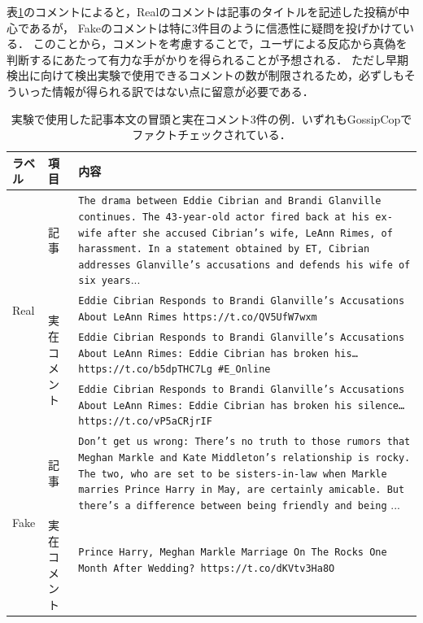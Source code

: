 表\ref{tbl:data_example}のコメントによると，Realのコメントは記事のタイトルを記述した投稿が中心であるが，
Fakeのコメントは特に3件目のように信憑性に疑問を投げかけている．
このことから，コメントを考慮することで，ユーザによる反応から真偽を判断するにあたって有力な手がかりを得られることが予想される．
ただし早期検出に向けて検出実験で使用できるコメントの数が制限されるため，必ずしもそういった情報が得られる訳ではない点に留意が必要である．
\begin{landscape}
\begin{table}[p]
    \centering
    \caption{実験で使用した記事本文の冒頭と実在コメント3件の例．いずれもGossipCopでファクトチェックされている．}
    \label{tbl:data_example}
    \begin{tabularx}{\linewidth}{llX}  \hline
        ラベル & 項目 & 内容 \\ \hline
        \multirow{4}{*}{Real} & 記事                         & \texttt{The drama between Eddie Cibrian and Brandi Glanville continues.  The 43-year-old actor fired back at his ex-wife after she accused Cibrian's wife, LeAnn Rimes, of harassment.  In a statement obtained by ET, Cibrian addresses Glanville's accusations and defends his wife of six years}...\\ \cline{2-3}
                              & \multirow{3}{*}{実在コメント} & \texttt{Eddie Cibrian Responds to Brandi Glanville’s Accusations About LeAnn Rimes https://t.co/QV5UfW7wxm}\\ \cline{3-3}
                              &                             & \texttt{Eddie Cibrian Responds to Brandi Glanville's Accusations About LeAnn Rimes: Eddie Cibrian has broken his… https://t.co/b5dpTHC7Lg \#E\_Online}\\ \cline{3-3}
                              &                             & \texttt{Eddie Cibrian Responds to Brandi Glanville's Accusations About LeAnn Rimes: Eddie Cibrian has broken his silence… https://t.co/vP5aCRjrIF}\\ \hline
        \multirow{4}{*}{Fake} & 記事                         & \texttt{Don’t get us wrong: There’s no truth to those rumors that Meghan Markle and Kate Middleton's relationship is rocky. The two, who are set to be sisters-in-law when Markle marries Prince Harry in May, are certainly amicable. But there’s a difference between being friendly and being} ...\\ \cline{2-3}
                              & \multirow{3}{*}{実在コメント} & \texttt{Prince Harry, Meghan Markle Marriage On The Rocks One Month After Wedding? https://t.co/dKVtv3Ha8O}\\ \cline{3-3}

\end{tabularx}
\end{table}
\end{landscape}
